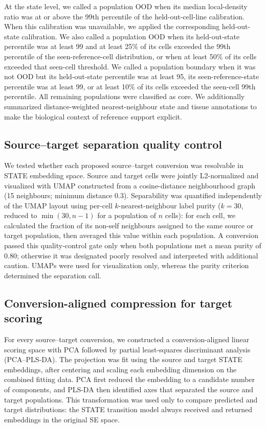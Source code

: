 \documentclass[11pt,a4paper]{article}
\begin{document}
At the state level, we called a population OOD when its median local-density ratio was at or above the 99th percentile of the held-out-cell-line calibration. When this calibration was unavailable, we applied the corresponding held-out-state calibration. We also called a population OOD when its held-out-state percentile was at least 99 and at least 25\% of its cells exceeded the 99th percentile of the seen-reference-cell distribution, or when at least 50\% of its cells exceeded that seen-cell threshold. We called a population boundary when it was not OOD but its held-out-state percentile was at least 95, its seen-reference-state percentile was at least 99, or at least 10\% of its cells exceeded the seen-cell 99th percentile. All remaining populations were classified as core. We additionally summarized distance-weighted nearest-neighbour state and tissue annotations to make the biological context of reference support explicit.

\subsection{Source--target separation quality control}
We tested whether each proposed source--target conversion was resolvable in STATE embedding space. Source and target cells were jointly L2-normalized and visualized with UMAP constructed from a cosine-distance neighbourhood graph (15 neighbours; minimum distance 0.3). Separability was quantified independently of the UMAP layout using per-cell $k$-nearest-neighbour label purity ($k=30$, reduced to $\min(30,n-1)$ for a population of $n$ cells): for each cell, we calculated the fraction of its non-self neighbours assigned to the same source or target population, then averaged this value within each population. A conversion passed this quality-control gate only when both populations met a mean purity of 0.80; otherwise it was designated poorly resolved and interpreted with additional caution. UMAPs were used for visualization only, whereas the purity criterion determined the separation call.

\subsection{Conversion-aligned compression for target scoring}
For every source--target conversion, we constructed a conversion-aligned linear scoring space with PCA followed by partial least-squares discriminant analysis (PCA--PLS-DA). The projection was fit using the source and target STATE embeddings, after centering and scaling each embedding dimension on the combined fitting data. PCA first reduced the embedding to a candidate number of components, and PLS-DA then identified axes that separated the source and target populations. This transformation was used only to compare predicted and target distributions: the STATE transition model always received and returned embeddings in the original SE space.
\end{document}
